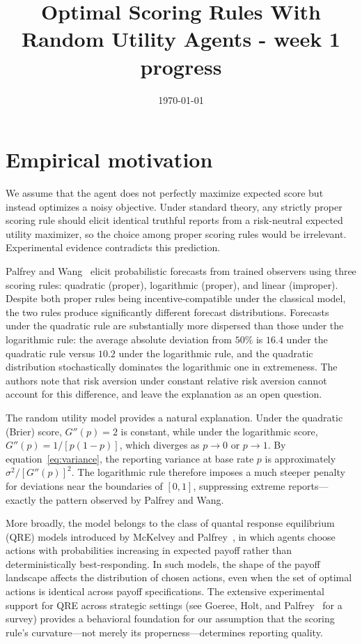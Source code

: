 \documentclass[11pt]{article}
\title{Optimal Scoring Rules With Random Utility Agents - week 1 progress}
\author{}
\date{\today}
\begin{document}
\maketitle

\section{Empirical motivation}\label{sec:empirical_motivation}

We assume that the agent does not perfectly maximize expected score but instead optimizes a noisy objective. Under standard theory, any strictly proper scoring rule should elicit identical truthful reports from a risk-neutral expected utility maximizer, so the choice among proper scoring rules would be irrelevant. Experimental evidence contradicts this prediction.

Palfrey and Wang~\cite{palfrey2009} elicit probabilistic forecasts from trained observers using three scoring rules: quadratic (proper), logarithmic (proper), and linear (improper). Despite both proper rules being incentive-compatible under the classical model, the two rules produce significantly different forecast distributions. Forecasts under the quadratic rule are substantially more dispersed than those under the logarithmic rule: the average absolute deviation from $50\%$ is $16.4$ under the quadratic rule versus $10.2$ under the logarithmic rule, and the quadratic distribution stochastically dominates the logarithmic one in extremeness. The authors note that risk aversion under constant relative risk aversion cannot account for this difference, and leave the explanation as an open question.

The random utility model provides a natural explanation. Under the quadratic (Brier) score, $G''(p) = 2$ is constant, while under the logarithmic score, $G''(p) = 1/[p(1-p)]$, which diverges as $p \to 0$ or $p \to 1$. By equation~\eqref{eq:variance}, the reporting variance at base rate $p$ is approximately $\sigma^2 / [G''(p)]^2$. The logarithmic rule therefore imposes a much steeper penalty for deviations near the boundaries of $[0,1]$, suppressing extreme reports---exactly the pattern observed by Palfrey and Wang.

More broadly, the model belongs to the class of quantal response equilibrium (QRE) models introduced by McKelvey and Palfrey~\cite{mckelvey1995}, in which agents choose actions with probabilities increasing in expected payoff rather than deterministically best-responding. In such models, the shape of the payoff landscape affects the distribution of chosen actions, even when the set of optimal actions is identical across payoff specifications. The extensive experimental support for QRE across strategic settings (see Goeree, Holt, and Palfrey~\cite{goeree2016} for a survey) provides a behavioral foundation for our assumption that the scoring rule's curvature---not merely its properness---determines reporting quality.
\end{document}
